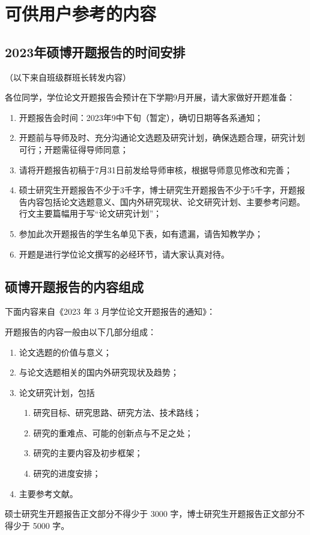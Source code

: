 
\section{可供用户参考的内容}

\subsection{2023年硕博开题报告的时间安排}

（以下来自班级群班长转发内容\cite{2024届硕博开题报告QQ通知}）

各位同学，学位论文开题报告会预计在下学期9月开展，请大家做好开题准备：
\begin{enumerate}
  \item 开题报告会时间：2023年9中下旬（暂定），确切日期等各系通知；
  \item 开题前与导师及时、充分沟通论文选题及研究计划，确保选题合理，研究计划可行；开题需征得导师同意；
  \item 请将开题报告初稿于7月31日前发给导师审核，根据导师意见修改和完善；
  \item 硕士研究生开题报告不少于3千字，博士研究生开题报告不少于5千字，开题报告内容包括论文选题意义、国内外研究现状、论文研究计划、主要参考问题。行文主要篇幅用于写“论文研究计划”；
  \item 参加此次开题报告的学生名单见下表，如有遗漏，请告知教学办；
  \item 开题是进行学位论文撰写的必经环节，请大家认真对待。
\end{enumerate}



\subsection{硕博开题报告的内容组成}

下面内容来自《2023 年 3 月学位论文开题报告的通知》\cite{2023届硕博学位论文开题报告通知}：

开题报告的内容一般由以下几部分组成：
\begin{enumerate}
  \item 论文选题的价值与意义；
  \item 与论文选题相关的国内外研究现状及趋势；
  \item 论文研究计划，包括
    \begin{enumerate}
      \item 研究目标、研究思路、研究方法、技术路线；
      \item 研究的重难点、可能的创新点与不足之处；
      \item 研究的主要内容及初步框架；
      \item 研究的进度安排；
    \end{enumerate}
  \item 主要参考文献。
\end{enumerate}

硕士研究生开题报告正文部分不得少于 3000 字，博士研究生开题报告正文部分不得少于 5000 字。